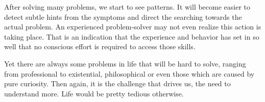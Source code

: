 After solving many problems, we start to see patterns. It will become easier to
detect subtle hints from the symptoms and direct the searching towards the
actual problem. An experienced problem-solver may not even realize this action
is taking place. That is an indication that the experience and behavior has set
in so well that no conscious effort is required to access those skills.

Yet there are always some problems in life that will be hard to solve, ranging
from professional to existential, philosophical or even those which are caused
by pure curiosity. Then again, it is the challenge that drives us, the need to
understand more. Life would be pretty tedious otherwise.
